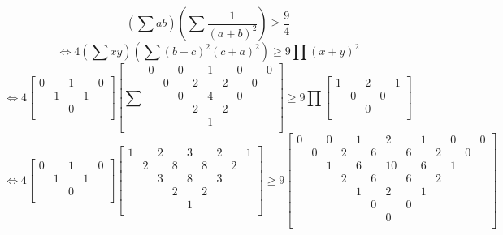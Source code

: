 \documentclass[UTF8]{ctexart}
\begin{document}
$$ (\displaystyle \sum ab)(\displaystyle \sum \dfrac{1}{(a+b)^{2}})\geq \dfrac{9}{4}$$
$$\Leftrightarrow 
4(\displaystyle \sum xy)(\displaystyle \sum (b+c)^{2}(c+a)^{2})\geq 9\prod (x+y)^{2}$$
$$\Leftrightarrow 
4\left[
\begin{smallmatrix}
	0& &1& &0\\
	&1& &1&\\
	& &0& &\\
\end{smallmatrix}
\right]
\left[\displaystyle \sum 
\begin{smallmatrix}
	0& &0& &1& &0& &0\\
	&0& &2& &2& &0&\\
	& &0& &4& &0& &\\
	& & &2& &2& & &\\
	& & & &1& & & &\\
\end{smallmatrix}
\right]\geq 9\prod 
\left[
\begin{smallmatrix}
	1& &2& &1\\
	&0& &0&\\
	& &0& &\\
\end{smallmatrix}
\right]
$$
$$\Leftrightarrow 
4\left[
\begin{smallmatrix}
	0& &1& &0\\
	&1& &1&\\
	& &0& &\\
\end{smallmatrix}
\right]
\left[
\begin{smallmatrix}
	1& &2& &3& &2& &1\\
	&2& &8& &8& &2&\\
	& &3& &8& &3& &\\
	& & &2& &2& & &\\
	& & & &1& & & &\\
\end{smallmatrix}
\right]\geq 9
\left[
\begin{smallmatrix}
	0& &0& &1& &2& &1& &0& &0\\
	&0& &2& &6& &6& &2& &0&\\
	& &1& &6& &10& &6& &1& &\\
	& & &2& &6& &6& &2& & &\\
	& & & &1& &2& &1& & & &\\
	& & & & &0& &0& & & & &\\
	& & & & & &0& & & & & &\\
\end{smallmatrix}
\right]$$
\end{document}
